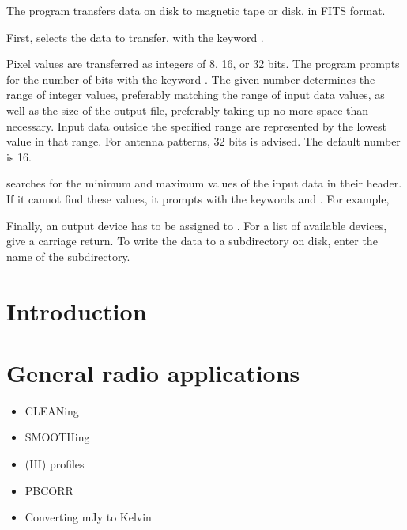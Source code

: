 The program  transfers data on disk to magnetic tape or
disk, in FITS format. 

First,  selects the data to transfer, with the keyword
. 
 
Pixel values are transferred as integers of 8, 16, or 32 bits.  The
program prompts for the number of bits with the keyword
.  The given number determines the range of integer
values, preferably matching the range of input data values, as well as
the size of the output file, preferably taking up no more space than
necessary.  Input data outside the specified range are represented by
the lowest value in that range.  For antenna patterns, 32 bits is
advised.  The default number is 16. 

 searches for the minimum and maximum values of the input
data in their header.  If it cannot find these values, it prompts with
the keywords  and .  For example,


Finally, an output device has to be assigned to .  For a
list of available devices, give a carriage return.  To write the data to
a subdirectory on disk, enter the name of the subdirectory. 

\label{chapter:Radio}

\section{Introduction}

\section{General radio applications}
\label{sec:RadioGen}

\begin{itemize}

\item CLEANing

\item SMOOTHing

\item (HI) profiles

\item PBCORR

\item Converting mJy to Kelvin

\end{itemize}

